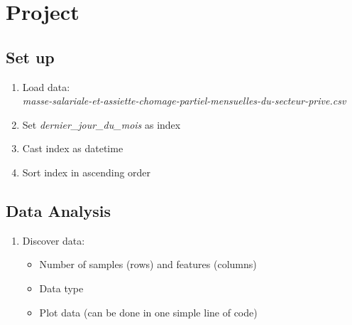 
\setcounter{section}{0}


\section{Project}


\subsection{Set up}

\begin{enumerate}
    \item Load data:\\
    \textit{masse-salariale-et-assiette-chomage-partiel-mensuelles-du-secteur-prive.csv}
    \item Set \textit{dernier\_jour\_du\_mois} as index
    \item Cast index as datetime
    \item Sort index in ascending order
\end{enumerate}


\subsection{Data Analysis}

\begin{enumerate}
    \item Discover data:
    \begin{itemize}
        \item Number of samples (rows) and features (columns)
        \item Data type
        \item Plot data (can be done in one simple line of code)
    \end{itemize}
    
\end{enumerate}

